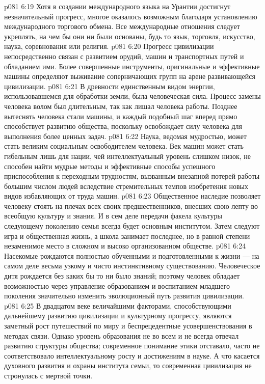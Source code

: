 \vs p081 6:19 Хотя в создании международного языка на Урантии достигнут незначительный прогресс, многое оказалось возможным благодаря установлению международного торгового обмена. Все международные отношения следует укреплять, на чем бы они ни были основаны, будь то язык, торговля, искусство, наука, соревнования или религия.
\vs p081 6:20 \pc {}\bibnobreakspace {} Прогресс цивилизации непосредственно связан с развитием орудий, машин и транспортных путей и обладанием ими. Более совершенные инструменты, оригинальные и эффективные машины определяют выживание соперничающих групп на арене развивающейся цивилизации.
\vs p081 6:21 В древности единственным видом энергии, использовавшемся для обработки земли, была человеческая сила. Процесс замены человека волом был длительным, так как лишал человека работы. Позднее вытеснять человека стали машины, и каждый подобный шаг вперед прямо способствует развитию общества, поскольку освобождает силу человека для выполнения более ценных задач.
\vs p081 6:22 Наука, ведомая мудростью, может стать великим социальным освободителем человека. Век машин может стать гибельным лишь для нации, чей интеллектуальный уровень слишком низок, не способен найти мудрые методы и эффективные способы успешного приспособления к переходным трудностям, вызванным внезапной потерей работы большим числом людей вследствие стремительных темпов изобретения новых видов избавляющих от труда машин.
\vs p081 6:23 \pc {}\bibnobreakspace {} Общественное наследие позволяет человеку стоять на плечах всех своих предшественников, внесших свою лепту во всеобщую культуру и знания. И в сем деле передачи факела культуры следующему поколению семья всегда будет основным институтом. Затем следуют игра и общественная жизнь, а школа занимает последнее, но в равной степени незаменимое место в сложном и высоко организованном обществе.
\vs p081 6:24 Насекомые рождаются полностью обученными и подготовленными к жизни --- на самом деле весьма узкому и чисто инстинктивному существованию. Человеческое дитя рождается без каких бы то ни было знаний; поэтому человек обладает возможностью через управление образованием и воспитанием младшего поколения значительно изменить эволюционный путь развития цивилизации.
\vs p081 6:25 В двадцатом веке величайшими факторами, способствующими дальнейшему развитию цивилизации и культурному прогрессу, являются заметный рост путешествий по миру и беспрецедентные усовершенствования в методах связи. Однако уровень образования не во всем и не всегда отвечал развитию структуры общества; современное понимание этики отставало, часто не соответствовало интеллектуальному росту и достижениям в науке. А что касается духовного развития и охраны института семьи, то современная цивилизация не стронулась с мертвой точки.
